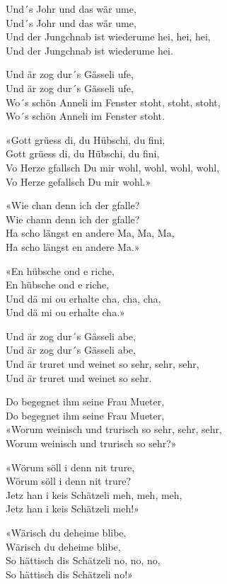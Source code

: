 \documentclass[
  letterpaper,
]{scrbook}
\begin{document}
Und´s Johr und das wär ume,\\
Und´s Johr und das wär ume,\\
Und der Jungchnab ist wiederume hei, hei, hei,\\
Und der Jungchnab ist wiederume hei.

Und är zog dur´s Gässeli ufe,\\
Und är zog dur´s Gässeli ufe,\\
Wo´s schön Anneli im Fenster stoht, stoht, stoht,\\
Wo´s schön Anneli im Fenster stoht.

«Gott grüess di, du Hübschi, du fini,\\
Gott grüess di, du Hübschi, du fini,\\
Vo Herze gfallsch Du mir wohl, wohl, wohl, wohl,\\
Vo Herze gefallsch Du mir wohl.»

«Wie chan denn ich der gfalle?\\
Wie chann denn ich der gfalle?\\
Ha scho längst en andere Ma, Ma, Ma,\\
Ha scho längst en andere Ma.»

«En hübsche ond e riche,\\
En hübsche ond e riche,\\
Und dä mi ou erhalte cha, cha, cha,\\
Und dä mi ou erhalte cha.»

Und är zog dur´s Gässeli abe,\\
Und är zog dur´s Gässeli abe,\\
Und är truret und weinet so sehr, sehr, sehr,\\
Und är truret und weinet so sehr.

Do begegnet ihm seine Frau Mueter,\\
Do begegnet ihm seine Frau Mueter,\\
«Worum weinisch und trurisch so sehr, sehr, sehr,\\
Worum weinisch und trurisch so sehr?»

«Wörum söll i denn nit trure,\\
Wörum söll i denn nit trure?\\
Jetz han i keis Schätzeli meh, meh, meh,\\
Jetz han i keis Schätzeli meh!»

«Wärisch du deheime blibe,\\
Wärisch du deheime blibe,\\
So hättisch dis Schätzeli no, no, no,\\
So hättisch dis Schätzeli no!»
\end{document}
